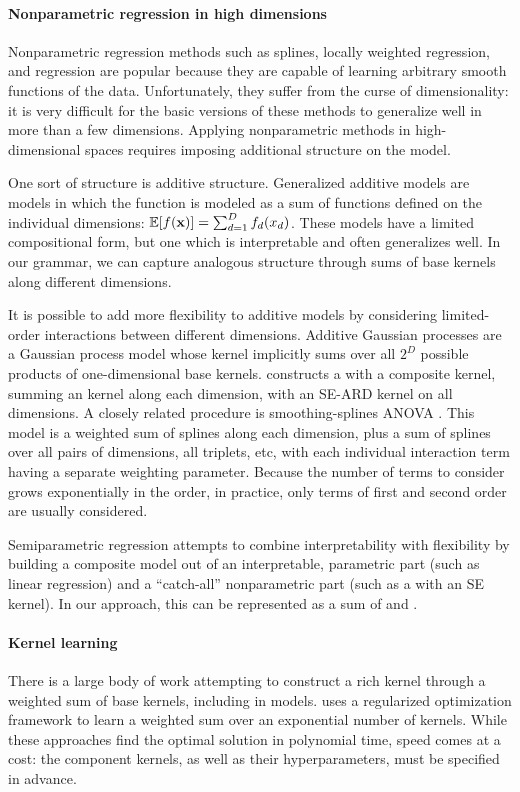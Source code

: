 \documentclass[twoside]{article}
\begin{document}
\paragraph{Nonparametric regression in high dimensions} Nonparametric regression methods such as splines, locally weighted regression, and \gp{} regression are popular because they are capable of learning arbitrary smooth functions of the data. Unfortunately, they suffer from the curse of dimensionality: it is very difficult for the basic versions of these methods to generalize well in more than a few dimensions. Applying nonparametric methods in high-dimensional spaces requires imposing additional structure on the model.

One sort of structure is additive structure. Generalized additive models \cite{hastie1990generalized} are models in which the function is modeled as a sum of functions defined on the individual dimensions: $\mathbb{E}[f({\bf{x}})] = \sum_{d=1}^D f_d(x_d)$. These models have a limited compositional form, but one which is interpretable and often generalizes well. In our grammar, we can capture analogous structure through sums of base kernels along different dimensions.

It is possible to add more flexibility to additive models by considering limited-order interactions between different dimensions. 
Additive Gaussian processes \cite{duvenaud2011additive11} are a Gaussian process model whose kernel implicitly sums over all $2^D$ possible products of one-dimensional base kernels.  
\cite{plate1999accuracy} constructs a \gp{} with a composite kernel, summing an \kSE{} kernel along each dimension, with an SE-ARD kernel on all dimensions.
A closely related procedure is smoothing-splines ANOVA \cite{wahba1990spline, gu2002smoothing}.
This model is a weighted sum of splines along each dimension, plus a sum of splines over all pairs of dimensions, all triplets, etc, with each individual interaction term having a separate weighting parameter.
Because the number of terms to consider grows exponentially in the order, in practice, only terms of first and second order are usually considered.

Semiparametric regression  attempts to combine interpretability with flexibility by building  a composite model out of an interpretable, parametric part (such as linear regression) and a ``catch-all'' nonparametric part (such as a \gp{} with an SE kernel).
In our approach, this can be represented as a sum of \kSE{} and \kLin{}.

\paragraph{Kernel learning}
There is a large body of work attempting to construct a rich kernel through a weighted sum of base kernels, including in \gp{} models.  
\cite{christoudias2009bayesian}
\cite{Bach_HKL} uses a regularized optimization framework to learn a weighted sum over an exponential number of kernels.
While these approaches find the optimal solution in polynomial time, speed comes at a cost: the component kernels, as well as their hyperparameters, must be specified in advance.
\end{document}
